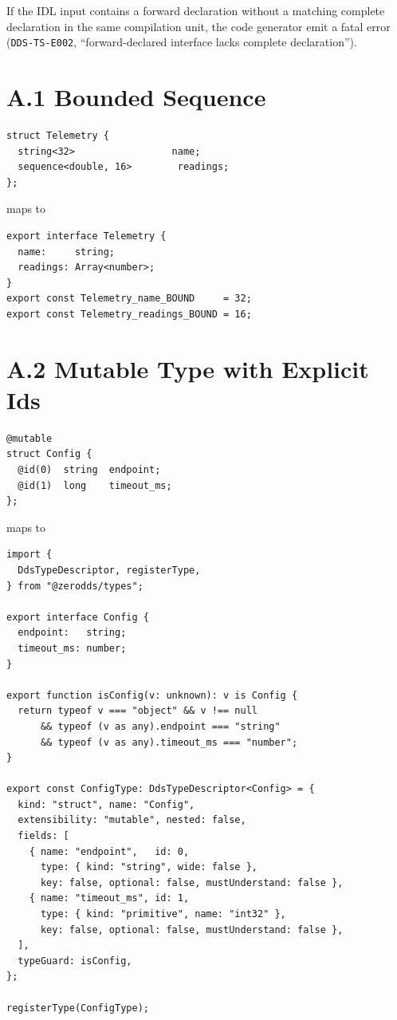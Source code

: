 \documentclass{../styles/zerodds-vendor-spec}
\begin{document}
If the IDL input contains a forward declaration without a
matching complete declaration in the same compilation unit, the
code generator  emit a fatal error
(\texttt{DDS-TS-E002}, ``forward-declared interface lacks complete
declaration'').


\section*{A.1 Bounded Sequence}

\begin{lstlisting}
struct Telemetry {
  string<32>                 name;
  sequence<double, 16>        readings;
};
\end{lstlisting}
maps to
\begin{lstlisting}
export interface Telemetry {
  name:     string;
  readings: Array<number>;
}
export const Telemetry_name_BOUND     = 32;
export const Telemetry_readings_BOUND = 16;
\end{lstlisting}

\section*{A.2 Mutable Type with Explicit Ids}

\begin{lstlisting}
@mutable
struct Config {
  @id(0)  string  endpoint;
  @id(1)  long    timeout_ms;
};
\end{lstlisting}
maps to
\begin{lstlisting}
import {
  DdsTypeDescriptor, registerType,
} from "@zerodds/types";

export interface Config {
  endpoint:   string;
  timeout_ms: number;
}

export function isConfig(v: unknown): v is Config {
  return typeof v === "object" && v !== null
      && typeof (v as any).endpoint === "string"
      && typeof (v as any).timeout_ms === "number";
}

export const ConfigType: DdsTypeDescriptor<Config> = {
  kind: "struct", name: "Config",
  extensibility: "mutable", nested: false,
  fields: [
    { name: "endpoint",   id: 0,
      type: { kind: "string", wide: false },
      key: false, optional: false, mustUnderstand: false },
    { name: "timeout_ms", id: 1,
      type: { kind: "primitive", name: "int32" },
      key: false, optional: false, mustUnderstand: false },
  ],
  typeGuard: isConfig,
};

registerType(ConfigType);
\end{lstlisting}
\end{document}
